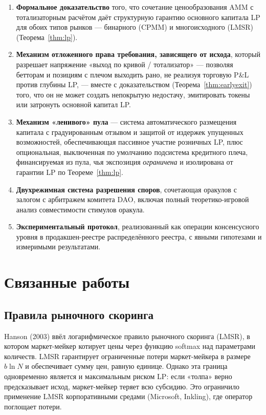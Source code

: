 \documentclass{ledger}
\theoremstyle{plain}
\theoremstyle{remark}
\begin{document}
\begin{enumerate}
  \item \textbf{Формальное доказательство} того, что сочетание ценообразования
  AMM с тотализаторным расчётом даёт структурную гарантию основного капитала LP
  для обоих типов рынков --- бинарного (CPMM) и многоисходного (LMSR)
  (Теорема~\ref{thm:lp}).
  \item \textbf{Механизм отложенного права требования, зависящего от исхода},
  который разрешает напряжение «выход по кривой / тотализатор» --- позволяя
  бетторам и позициям с плечом выходить рано, не реализуя торговую P\&L против
  глубины LP, --- вместе с доказательством (Теорема~\ref{thm:earlyexit}) того, что
  он не может создать непокрытую недостачу, эмитировать токены или затронуть
  основной капитал LP.
  \item \textbf{Механизм «ленивого» пула} --- система автоматического размещения
  капитала с градуированным отзывом и защитой от издержек упущенных возможностей,
  обеспечивающая пассивное участие розничных LP, плюс опциональная, выключенная по
  умолчанию подсистема кредитного плеча, финансируемая из пула, чья экспозиция
  \emph{ограничена} и изолирована от гарантии LP по Теореме~\ref{thm:lp}.
  \item \textbf{Двухрежимная система разрешения споров}, сочетающая оракулов с
  залогом с арбитражем комитета DAO, включая полный теоретико-игровой анализ
  совместимости стимулов оракула.
  \item \textbf{Экспериментальный протокол}, реализованный как операции
  консенсусного уровня в продакшен-реестре распределённого реестра, с явными
  гипотезами и измеримыми результатами.
\end{enumerate}

\section{Связанные работы}\label{sec:related}

\subsection{Правила рыночного скоринга}

Hanson (2003) ввёл логарифмическое правило рыночного скоринга (LMSR), в котором
маркет-мейкер котирует цены через функцию softmax над параметрами количеств. LMSR
гарантирует ограниченные потери маркет-мейкера в размере $b \ln N$ и обеспечивает
сумму цен, равную единице. Однако эта граница одновременно является и
максимальным риском LP: если «толпа» верно предсказывает исход, маркет-мейкер
теряет всю субсидию. Это ограничило применение LMSR корпоративными средами
(Microsoft, Inkling), где оператор поглощает потери.
\end{document}
